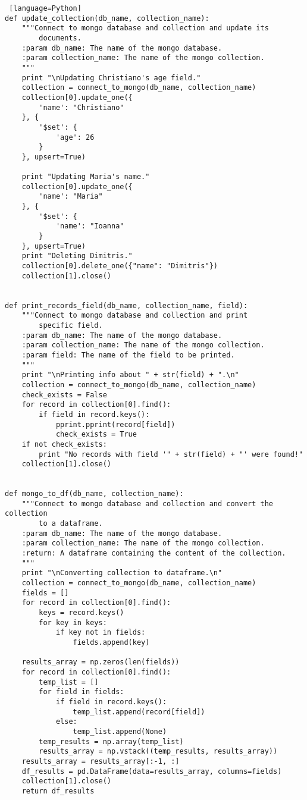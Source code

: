 \documentclass[11pt]{article}
\begin{document}
\begin{lstlisting} [language=Python]
def update_collection(db_name, collection_name):
    """Connect to mongo database and collection and update its
        documents.
    :param db_name: The name of the mongo database.
    :param collection_name: The name of the mongo collection.
    """
    print "\nUpdating Christiano's age field."
    collection = connect_to_mongo(db_name, collection_name)
    collection[0].update_one({
        'name': "Christiano"
    }, {
        '$set': {
            'age': 26
        }
    }, upsert=True)

    print "Updating Maria's name."
    collection[0].update_one({
        'name': "Maria"
    }, {
        '$set': {
            'name': "Ioanna"
        }
    }, upsert=True)
    print "Deleting Dimitris."
    collection[0].delete_one({"name": "Dimitris"})
    collection[1].close()


def print_records_field(db_name, collection_name, field):
    """Connect to mongo database and collection and print
        specific field.
    :param db_name: The name of the mongo database.
    :param collection_name: The name of the mongo collection.
    :param field: The name of the field to be printed.
    """
    print "\nPrinting info about " + str(field) + ".\n"
    collection = connect_to_mongo(db_name, collection_name)
    check_exists = False
    for record in collection[0].find():
        if field in record.keys():
            pprint.pprint(record[field])
            check_exists = True
    if not check_exists:
        print "No records with field '" + str(field) + "' were found!"
    collection[1].close()


def mongo_to_df(db_name, collection_name):
    """Connect to mongo database and collection and convert the collection
        to a dataframe.
    :param db_name: The name of the mongo database.
    :param collection_name: The name of the mongo collection.
    :return: A dataframe containing the content of the collection.
    """
    print "\nConverting collection to dataframe.\n"
    collection = connect_to_mongo(db_name, collection_name)
    fields = []
    for record in collection[0].find():
        keys = record.keys()
        for key in keys:
            if key not in fields:
                fields.append(key)

    results_array = np.zeros(len(fields))
    for record in collection[0].find():
        temp_list = []
        for field in fields:
            if field in record.keys():
                temp_list.append(record[field])
            else:
                temp_list.append(None)
        temp_results = np.array(temp_list)
        results_array = np.vstack((temp_results, results_array))
    results_array = results_array[:-1, :]
    df_results = pd.DataFrame(data=results_array, columns=fields)
    collection[1].close()
    return df_results



\end{lstlisting}
\end{document}
